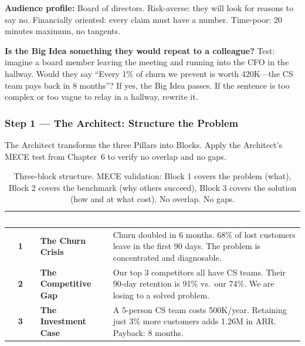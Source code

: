 \noindent\textbf{Audience profile:} Board of directors. Risk-averse: they will look for reasons to say no. Financially oriented: every claim must have a number. Time-poor: 20 minutes maximum, no tangents.

\begin{insightbox}
\textbf{Is the Big Idea something they would repeat to a colleague?} Test: imagine a board member leaving the meeting and running into the CFO in the hallway. Would they say ``Every 1\% of churn we prevent is worth \texteuro{}420K---the CS team pays back in 8 months''? If yes, the Big Idea passes. If the sentence is too complex or too vague to relay in a hallway, rewrite it.
\end{insightbox}

\subsubsection*{Step 1 --- The Architect: Structure the Problem}

The Architect transforms the three Pillars into Blocks. Apply the Architect's MECE test from Chapter~6 to verify no overlap and no gaps.

\begin{table}[H]
\centering
\small
{}
\begin{tabularx}{\textwidth}{>{\bfseries\color{heading}}c >{\bfseries}l X}
\toprule
\rowcolor{tableheader}
\textcolor{white}{\textbf{Block}} & \textcolor{white}{\textbf{Title}} & \textcolor{white}{\textbf{Argument}} \\
\midrule
1 & The Churn Crisis & Churn doubled in 6 months. 68\% of lost customers leave in the first 90 days. The problem is concentrated and diagnosable. \\
2 & The Competitive Gap & Our top 3 competitors all have CS teams. Their 90-day retention is 91\% vs.\ our 74\%. We are losing to a solved problem. \\
3 & The Investment Case & A 5-person CS team costs \texteuro{}500K/year. Retaining just 3\% more customers adds \texteuro{}1.26M in ARR. Payback: 8 months. \\
\bottomrule
\end{tabularx}
\caption{Three-block structure. MECE validation: Block 1 covers the problem (what), Block 2 covers the benchmark (why others succeed), Block 3 covers the solution (how and at what cost). No overlap. No gaps.}
\end{table}

